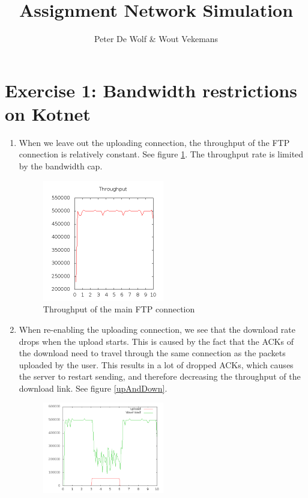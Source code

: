 \documentclass[a4paper,12pt,titlepage]{report}
\title{Assignment Network Simulation}
\author{Peter De Wolf \& Wout Vekemans}
\begin{document}
\begin{titlepage}
	\maketitle
	\thispagestyle{empty}
\end{titlepage}

\section{Exercise 1: Bandwidth restrictions on Kotnet}
\begin{enumerate}
 \item When we leave out the uploading connection, the throughput of the FTP connection is relatively constant. See figure \ref{noUpload}. The throughput rate is limited by the bandwidth cap. 
  \begin{figure}[htb]
\centering
\includegraphics[width=0.5\textwidth]{noUpload.png}
\caption{Throughput of the main FTP connection}
\label{noUpload}
\end{figure}
\item When re-enabling the uploading connection, we see that the download rate drops when the upload starts. This is caused by the fact that the ACKs of the download need to travel through the same connection as the packets uploaded by the user. This results in a lot of dropped ACKs, which causes the server to restart sending, and therefore decreasing the throughput of the download link. See figure \ref{upAndDown}.\\
  \begin{figure}[htb]
\centering
\includegraphics[width=0.5\textwidth]{withUpload.png}

\end{figure}
\end{enumerate}
\end{document}
